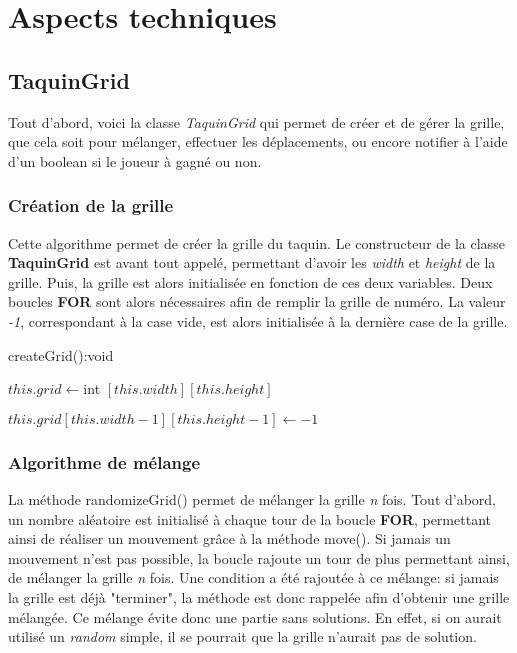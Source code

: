 \chapter{Aspects techniques}

	\section{TaquinGrid}

		Tout d'abord, voici la classe \textit{TaquinGrid} qui permet de créer et de gérer la grille, que cela soit pour mélanger, effectuer les déplacements, ou encore notifier à l'aide d'un boolean si le joueur à gagné ou non.

		\subsection{Création de la grille}

			Cette algorithme permet de créer la grille du taquin. Le constructeur de la classe \textbf{TaquinGrid} est avant tout appelé, permettant d'avoir les \textit{width} et \textit{height} de la grille. Puis, la grille est alors initialisée en fonction de ces deux variables. Deux boucles \textbf{FOR} sont alors nécessaires afin de remplir la grille de numéro. La valeur \textit{-1}, correspondant à la case vide, est alors initialisée à la dernière case de la grille.

			\begin{algorithm}[H]
				\caption{createGrid():void}
				$this.grid \leftarrow $int $[this.width][this.height]$


				$this.grid[this.width-1][this.height-1] \leftarrow -1$
			\end{algorithm}

		\subsection{Algorithme de mélange}

			La méthode randomizeGrid() permet de mélanger la grille \textit{n} fois. Tout d'abord, un nombre aléatoire est initialisé à chaque tour de la boucle \textbf{FOR}, permettant ainsi de réaliser un mouvement grâce à la méthode move(). Si jamais un mouvement n'est pas possible, la boucle rajoute un tour de plus permettant ainsi, de mélanger la grille \textit{n} fois. Une condition a été rajoutée à ce mélange: si jamais la grille est déjà "terminer", la méthode est donc rappelée afin d'obtenir une grille mélangée. Ce mélange évite donc une partie sans solutions. En effet, si on aurait utilisé un \textit{random} simple, il se pourrait que la grille n'aurait pas de solution.\\

